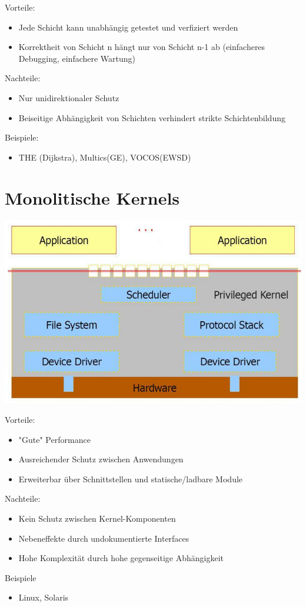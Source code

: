 \documentclass[a4paper]{scrreprt}
\begin{document}
Vorteile:
	\begin{itemize}
		\item Jede Schicht kann unabhängig getestet und verfiziert werden
		\item Korrektheit von Schicht n hängt nur von Schicht n-1 ab (einfacheres Debugging, einfachere Wartung)
	\end{itemize}

Nachteile:
	\begin{itemize}
		\item Nur unidirektionaler Schutz
		\item Beiseitige Abhängigkeit von Schichten verhindert strikte Schichtenbildung
	\end{itemize}
Beispiele:
	\begin{itemize}
		\item THE (Dijkstra), Multics(GE), VOCOS(EWSD)
	\end{itemize}
	
\section{Monolitische Kernels}
	\begin{center}
		\includegraphics[scale=0.3]{graphics/monolithickernel.png}
	\end{center}
	Vorteile:
		\begin{itemize}
			\item "Gute" Performance
			\item Ausreichender Schutz zwischen Anwendungen
			\item Erweiterbar über Schnittstellen und statische/ladbare Module
		\end{itemize}
	Nachteile:
		\begin{itemize}
			\item Kein Schutz zwischen Kernel-Komponenten
			\item Nebeneffekte durch undokumentierte Interfaces
			\item Hohe Komplexität durch hohe gegenseitige Abhängigkeit
		\end{itemize}
	Beispiele
		\begin{itemize}
			\item Linux, Solaris
		\end{itemize}
\end{document}
